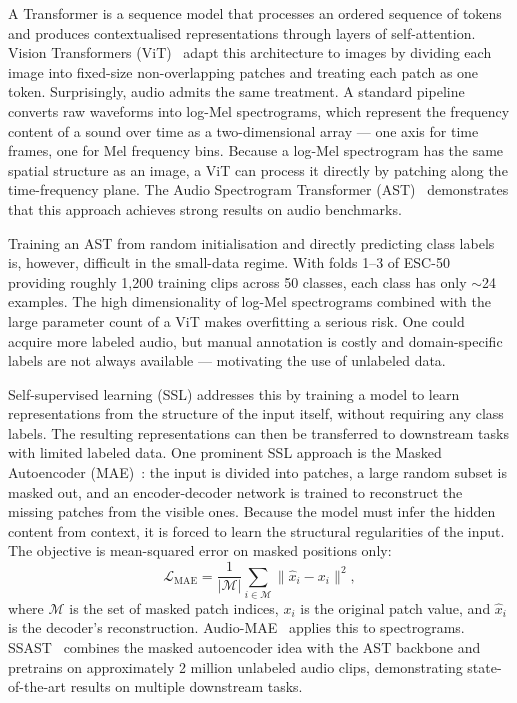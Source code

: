 \documentclass{article}
\begin{document}
A Transformer is a sequence model that processes an ordered sequence of tokens and produces contextualised representations through layers of self-attention. Vision Transformers (ViT)~\cite{dosovitskiy2020image} adapt this architecture to images by dividing each image into fixed-size non-overlapping patches and treating each patch as one token. Surprisingly, audio admits the same treatment. A standard pipeline converts raw waveforms into log-Mel spectrograms, which represent the frequency content of a sound over time as a two-dimensional array — one axis for time frames, one for Mel frequency bins. Because a log-Mel spectrogram has the same spatial structure as an image, a ViT can process it directly by patching along the time-frequency plane. The Audio Spectrogram Transformer (AST)~\cite{gong2021ast} demonstrates that this approach achieves strong results on audio benchmarks.

Training an AST from random initialisation and directly predicting class labels is, however, difficult in the small-data regime. With folds 1--3 of ESC-50 providing roughly 1,200 training clips across 50 classes, each class has only $\sim$24 examples. The high dimensionality of log-Mel spectrograms combined with the large parameter count of a ViT makes overfitting a serious risk. One could acquire more labeled audio, but manual annotation is costly and domain-specific labels are not always available — motivating the use of unlabeled data.

Self-supervised learning (SSL) addresses this by training a model to learn representations from the structure of the input itself, without requiring any class labels. The resulting representations can then be transferred to downstream tasks with limited labeled data. One prominent SSL approach is the Masked Autoencoder (MAE)~\cite{he2022masked}: the input is divided into patches, a large random subset is masked out, and an encoder-decoder network is trained to reconstruct the missing patches from the visible ones. Because the model must infer the hidden content from context, it is forced to learn the structural regularities of the input. The objective is mean-squared error on masked positions only:
\[
    \mathcal{L}_\text{MAE} = \frac{1}{|\mathcal{M}|}\sum_{i \in \mathcal{M}} \|\hat{x}_i - x_i\|^2,
\]
where $\mathcal{M}$ is the set of masked patch indices, $x_i$ is the original patch value, and $\hat{x}_i$ is the decoder's reconstruction. Audio-MAE~\cite{huang2022masked} applies this to spectrograms. SSAST~\cite{gong2022ssast} combines the masked autoencoder idea with the AST backbone and pretrains on approximately 2 million unlabeled audio clips, demonstrating state-of-the-art results on multiple downstream tasks.
\end{document}
